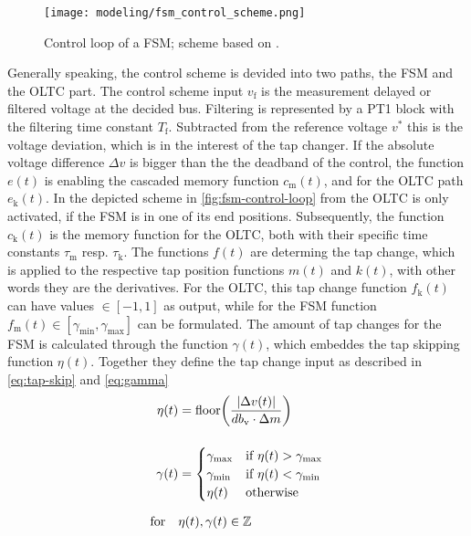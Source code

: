 \begin{figure}[htb!]
    \centering
    \texttt{[image: modeling/fsm\_control\_scheme.png]}
    \caption[Control loop of a \acf{FSM}]{Control loop of a \acs{FSM}; scheme based on \textcite{burlakin_2024}.}
    \label{fig:fsm-control-loop}
\end{figure}

Generally speaking, the control scheme is devided into two paths, the \acs{FSM} and the \acs{OLTC} part.
The control scheme input $v_\mathrm{f}$ is the measurement delayed or filtered voltage at the decided bus.
Filtering is represented by a PT1 block with the filtering time constant $T_\mathrm{f}$.
Subtracted from the reference voltage $v^*$ this is the voltage deviation, which is in the interest of the tap changer. 
If the absolute voltage difference $\Delta v$ is bigger than the the deadband of the control, the function $e(t)$ is enabling the cascaded memory function $c_\mathrm{m}(t)$, and for the \acs{OLTC} path $e_\mathrm{k}(t)$.
In the depicted scheme in \autoref{fig:fsm-control-loop} from \autocite{burlakin_2024} the \acs{OLTC} is only activated, if the \acs{FSM} is in one of its end positions.
Subsequently, the function $c_\mathrm{k}(t)$ is the memory function for the \acs{OLTC}, both with their specific time constants $\tau_\mathrm{m}$ resp. $\tau_\mathrm{k}$.
The functions $f(t)$ are determing the tap change, which is applied to the respective tap position functions $m(t)$ and $k(t)$, with other words they are the derivatives.
For the \acs{OLTC}, this tap change function $f_\mathrm{k}(t)$ can have values $\in [-1,1]$ as output, while for the \acs{FSM} function $f_\mathrm{m}(t) \in [\gamma_\mathrm{min},\gamma_\mathrm{max}]$ can be formulated.
The amount of tap changes for the \acs{FSM} is calculated through the function $\gamma(t)$, which embeddes the tap skipping function $\eta(t)$.
Together they define the tap change input as described in \autoref{eq:tap-skip} and \autoref{eq:gamma}
\begin{align}
    \eta(t) &= \text{floor}\bigg( \frac{\vert \Delta v(t) \vert}{db_\mathrm{v} \cdot \Delta m} \bigg) \label{eq:tap-skip}\\[12pt]
    \gamma(t) &= \begin{cases}
        \gamma_\mathrm{max} & \text{if } \eta(t) > \gamma_\mathrm{max} \\
        \gamma_\mathrm{min} & \text{if } \eta(t) < \gamma_\mathrm{min} \\
        \eta(t) & \text{otherwise}
    \end{cases} \label{eq:gamma} \\[6pt]
    \text{for}\quad&\eta(t),\gamma(t) \in \mathbb{Z} \notag
\end{align}
